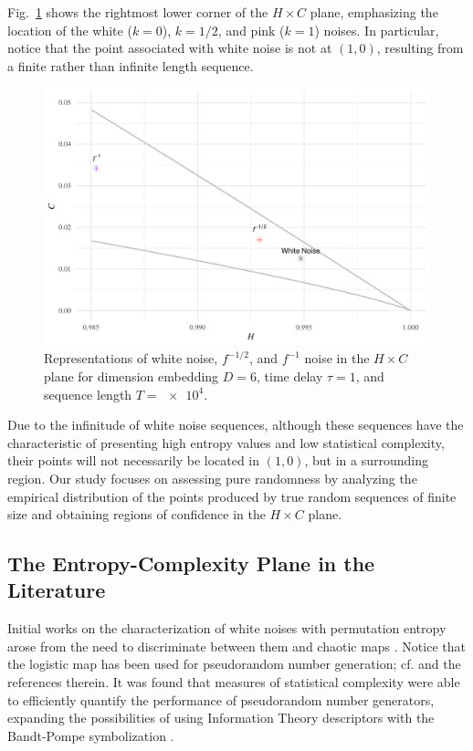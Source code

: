 \documentclass[alpha-refs]{wiley-article}
\begin{document}
Fig.~\ref{fig:RightMostCorner} shows the rightmost lower corner of the $H\times C$ plane, emphasizing the location of the white ($k=0$), $k=1/2$, and pink ($k=1$) noises.
In particular, notice that the point associated with white noise is not at $(1,0)$, resulting from a finite rather than infinite length sequence.

\begin{figure}[hbt]
	\centering
	\includegraphics[width=\linewidth]{RightMostCorner}
	\caption{Representations of white noise, $f^{-1/2}$, and $f^{-1}$ noise in the $H \times C$ plane  for dimension embedding $D = 6$, time delay $\tau = 1$, and sequence length $T = \num[scientific-notation=true]{e4}$.}
	\label{fig:RightMostCorner}
\end{figure}

Due to the infinitude of white noise sequences, although these sequences have the characteristic of presenting high entropy values and low statistical complexity, their points will not necessarily be located in $(1, 0)$, but in a surrounding region.
Our study focuses on assessing pure randomness by analyzing the empirical distribution of the points produced by true random sequences of finite size and obtaining regions of confidence in the $H \times C$ plane.

\subsection{The Entropy-Complexity Plane in the Literature}\label{Sec:BPApplications}

Initial works on the characterization of white noises with permutation entropy arose from the need to discriminate between them and chaotic maps \citep{rosso2013characterization, xiong2020complexity}.
Notice that the logistic map has been used for pseudorandom number generation; cf. \citet{AnalyzingLogisticMapPseudorandomNumberGeneratorsforPeriodicityInducedbyFinitePrecisionFloatingPointRepresentation} and the references therein.
It was found that measures of statistical complexity were able to efficiently quantify the performance of pseudorandom number generators, expanding the possibilities of using Information Theory descriptors with the Bandt-Pompe symbolization \citep{larrondo2013statistical, gonzalez2005statistical}.
\end{document}
